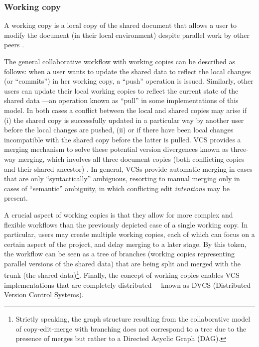 \documentclass{sig-alternate}
\begin{document}
\subsubsection{Working copy}\label{subsec:workingcopy}
A working copy is a local copy of the shared document that allows a user
to modify the document (in their local environment) despite parallel work by other peers
\cite{Collins-Sussman}.

The general collaborative workflow with working copies can be described as follows:
when a user wants to update the shared data to reflect the local changes (or ``commits'')
in her working copy, a ``push'' operation is issued. Similarly, other users can update their local
working copies to reflect the current state of the shared data ---an operation
known as ``pull'' in some implementations of this model.
In both cases a conflict between the local and shared copies may arise if (i) the shared
copy is successfully updated in a particular way by another user before the local changes
are pushed, (ii) or if there have been local changes incompatible with the shared copy before
the latter is pulled.
VCS provides a merging mechanism to solve these potential version divergences known as
three-way merging, which involves all three document copies (both conflicting copies and their
shared ancestor) \cite{Altmanninger2009}. In general, VCSs provide automatic merging in cases
that are only ``syntactically'' ambiguous, resorting to manual merging only in cases
of ``semantic'' ambiguity, in which conflicting edit \textit{intentions} may be present.

A crucial aspect of working copies is that they allow for more complex and flexible workflows
than the previously depicted case of a single working copy. In particular, users may create
multiple working copies, each of which can focus on a certain aspect of the project, and
delay merging to a later stage.
By this token, the workflow can be seen as a tree of branches (working copies
representing parallel versions of the shared data) that are being split and merged with
the trunk (the shared data)\footnote{
  Strictly speaking, the graph structure resulting from the collaborative model of copy-edit-merge
  with branching does not correspond to a tree due to the presence of merges but rather to a
  Directed Acyclic Graph (DAG).
}.
Finally, the concept of working copies enables VCS implementations that are completely distributed
---known as DVCS (Distributed Version Control Systems).
\end{document}
